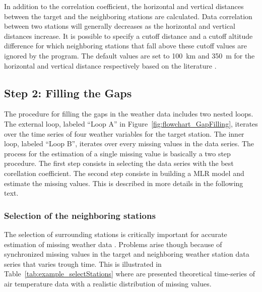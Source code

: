 \documentclass[WHATMANUAL.tex]{subfiles}
\begin{document}
In addition to the correlation coefficient, the horizontal and vertical distances between the target and the neighboring stations are calculated. Data correlation between two stations will generally decreases as the horizontal and vertical distances increase. It is possible to specify a cutoff distance and a cutoff altitude difference for which neighboring stations that fall above these cutoff values are ignored by the program. The default values are set to 100~km and 350~m for the horizontal and vertical distance respectively based on the literature 
\citep{tronci_comparison_1986,xia_forest_1999,simolo_improving_2010}.

\subsection{Step 2: Filling the Gaps}

The procedure for filling the gaps in the weather data includes two nested loops. The external loop, labeled ``Loop A'' in Figure~\ref{fig:flowchart_GapFilling}, iterates over the time series of four weather variables for the target station. The inner loop, labeled ``Loop B'', iterates over every missing values in the data series. The process for the estimation of a single missing value is basically a two step procedure. The first step consists in selecting the data series with the best corellation coefficient. The second step consiste in building a MLR model and estimate the missing values. This is described in more details in the following text.

\subsubsection{Selection of the neighboring stations}

The selection of surrounding stations is critically important for accurate estimation of missing weather data \citep{eischeid_quality_1995}. Problems arise though because of synchronized missing values in the target and neighboring weather station data series that varies trough time. This is illustrated in Table~\ref{tab:example_selectStations} where are presented theoretical time-series of air temperature data with a realistic distribution of missing values.
\end{document}
